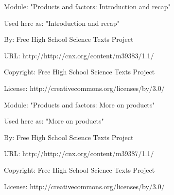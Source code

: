       \par\vspace{9pt}\noindent\begin{minipage}{\textwidth}
      Module: "Products and factors: Introduction and recap" \par\nopagebreak\noindent
      Used here as: "Introduction and recap" \par\nopagebreak\noindent
        By: Free High School Science Texts Project\par\nopagebreak\noindent
      URL: http://http://cnx.org/content/m39383/1.1/\par\nopagebreak\noindent
      \par\nopagebreak\noindent
      Copyright: Free High School Science Texts Project\par\nopagebreak\noindent
      License:  http://creativecommons.org/licenses/by/3.0/\par\nopagebreak\noindent
      \par\end{minipage}
      \par\vspace{9pt}\noindent\begin{minipage}{\textwidth}
      Module: "Products and factors: More on products" \par\nopagebreak\noindent
      Used here as: "More on products" \par\nopagebreak\noindent
        By: Free High School Science Texts Project\par\nopagebreak\noindent
      URL: http://http://cnx.org/content/m39387/1.1/\par\nopagebreak\noindent
      \par\nopagebreak\noindent
      Copyright: Free High School Science Texts Project\par\nopagebreak\noindent
      License:  http://creativecommons.org/licenses/by/3.0/\par\nopagebreak\noindent
      \par\end{minipage}
